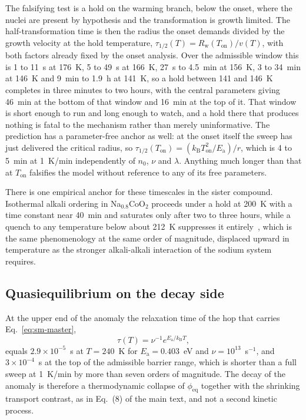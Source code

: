 \documentclass[reprint,twocolumn,prb,amsmath,amssymb,superscriptaddress,floatfix]{revtex4-2}
\newcommand{\kB}{k_{\mathrm{B}}}
\newcommand{\Ea}{E_{\mathrm{a}}}
\newcommand{\Ton}{T_{\mathrm{on}}}
\begin{document}
The falsifying test is a hold on the warming branch, below the onset, where the nuclei are
present by hypothesis and the transformation is growth limited. The half-transformation time is
then the radius the onset demands divided by the growth velocity at the hold temperature,
$\tau_{1/2}(T)=R_{\mathrm{w}}(\Ton)/v(T)$, with both factors already fixed by the onset
analysis. Over the admissible window this is 1 to 11~s at 176~K, 5 to 49~s at 166~K, 27~s to
4.5~min at 156~K, 3 to 34~min at 146~K and 9~min to 1.9~h at 141~K, so a hold between 141 and
146~K completes in three minutes to two hours, with the central parameters giving 46~min at the
bottom of that window and 16~min at the top of it.
That window is short enough to run and long enough to watch, and a hold there that produces
nothing is fatal to the mechanism rather than merely uninformative. The prediction has a
parameter-free anchor as well: at the onset itself the sweep has just delivered the critical
radius, so $\tau_{1/2}(\Ton)=(\kB\Ton^{2}/\Ea)/r$, which is 4 to 5~min at 1~K/min independently
of $n_{0}$, $\nu$ and $\lambda$. Anything much longer than that at $\Ton$ falsifies the model
without reference to any of its free parameters.

There is one empirical anchor for these timescales in the sister compound. Isothermal alkali
ordering in Na$_{0.8}$CoO$_{2}$ proceeds under a hold at 200~K with a time constant near 40~min
and saturates only after two to three hours, while a quench to any temperature below about 212~K
suppresses it entirely~\cite{Schulze2008}, which is the same phenomenology at the same order of
magnitude, displaced upward in temperature as the stronger alkali-alkali interaction of the
sodium system requires.

\subsection{Quasiequilibrium on the decay side}

At the upper end of the anomaly the relaxation time of the hop that carries
Eq.~\eqref{eq:sm-master},
\begin{equation}
  \tau(T)=\nu^{-1}e^{\Ea/\kB T},
  \label{eq:sm-tau}
\end{equation}
equals $2.9\times10^{-5}$~s at $T=240$~K for $\Ea=0.403$~eV and $\nu=10^{13}$~s$^{-1}$, and
$3\times10^{-4}$~s at the top of the admissible barrier range, which is shorter than a full
sweep at 1~K/min by more than seven orders of magnitude. The decay of the
anomaly is therefore a thermodynamic collapse of $\phi_{\mathrm{eq}}$ together with the shrinking
transport contrast, as in Eq.~(8) of the main text, and not a second kinetic process.
\end{document}
